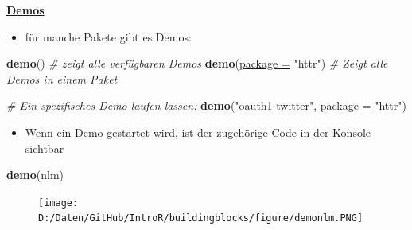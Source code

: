 \documentclass[ignorenonframetext,]{beamer}
\newenvironment{Shaded}{\begin{snugshade}}{\end{snugshade}}
\newcommand{\KeywordTok}[1]{\textcolor[rgb]{0.26,0.66,0.93}{\textbf{#1}}}
\newcommand{\DataTypeTok}[1]{\textcolor[rgb]{0.74,0.68,0.62}{\underline{#1}}}
\newcommand{\StringTok}[1]{\textcolor[rgb]{0.02,0.61,0.04}{#1}}
\newcommand{\CommentTok}[1]{\textcolor[rgb]{0.00,0.40,1.00}{\textit{#1}}}
\newcommand{\NormalTok}[1]{\textcolor[rgb]{0.74,0.68,0.62}{#1}}
\providecommand{\tightlist}{%
  \setlength{\itemsep}{0pt}\setlength{\parskip}{0pt}}
\begin{document}
\begin{frame}[fragile]{\href{http://r-pkgs.had.co.nz/demo.html}{\textbf{Demos}}}

\begin{itemize}
\tightlist
\item
  für manche Pakete gibt es Demos:
\end{itemize}

\begin{Shaded}
\begin{Highlighting}[]
\KeywordTok{demo}\NormalTok{() }\CommentTok{# zeigt alle verfügbaren Demos}
\KeywordTok{demo}\NormalTok{(}\DataTypeTok{package =} \StringTok{"httr"}\NormalTok{) }\CommentTok{# Zeigt alle Demos in einem Paket}

\CommentTok{# Ein spezifisches Demo laufen lassen:}
\KeywordTok{demo}\NormalTok{(}\StringTok{"oauth1-twitter"}\NormalTok{, }\DataTypeTok{package =} \StringTok{"httr"}\NormalTok{) }
\end{Highlighting}
\end{Shaded}

\begin{itemize}
\tightlist
\item
  Wenn ein Demo gestartet wird, ist der zugehörige Code in der Konsole
  sichtbar
\end{itemize}

\begin{Shaded}
\begin{Highlighting}[]
\KeywordTok{demo}\NormalTok{(nlm)}
\end{Highlighting}
\end{Shaded}

\begin{figure}
\centering
\texttt{[image: D:/Daten/GitHub/IntroR/buildingblocks/figure/demonlm.PNG]}
\caption{}
\end{figure}

\end{frame}
\end{document}
